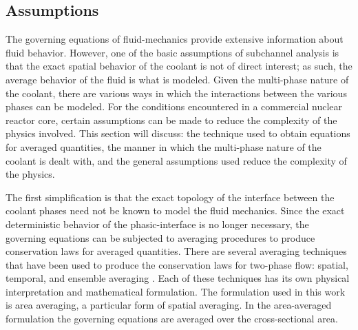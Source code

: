 \subsection{Assumptions}
\label{subsect:assumptions}

The governing equations of fluid-mechanics provide extensive information about fluid behavior.
However, one of the basic assumptions of subchannel analysis is that the exact spatial behavior of the coolant is not of direct interest; as such, the average behavior of the fluid is what is modeled.
Given the multi-phase nature of the coolant, there are various ways in which the interactions between the various phases can be modeled.
For the conditions encountered in a commercial nuclear reactor core, certain assumptions can be made to reduce the complexity of the physics involved.
This section will discuss: the technique used to obtain equations for averaged quantities, the manner in which the multi-phase nature of the coolant is dealt with, and the general assumptions used reduce the complexity of the physics.

The first simplification is that the exact topology of the interface between the coolant phases need not be known to model the fluid mechanics.
Since the exact deterministic behavior of the phasic-interface is no longer necessary, the governing equations can be subjected to averaging procedures to produce conservation laws for averaged quantities.
There are several averaging techniques that have been used to produce the conservation laws for two-phase flow: spatial, temporal, and ensemble averaging \cite{Drew1998, Todreas2011}.
Each of these techniques has its own physical interpretation and mathematical formulation.
The formulation used in this work is area averaging, a particular form of spatial averaging.
In the area-averaged formulation the governing equations are averaged over the cross-sectional area.

